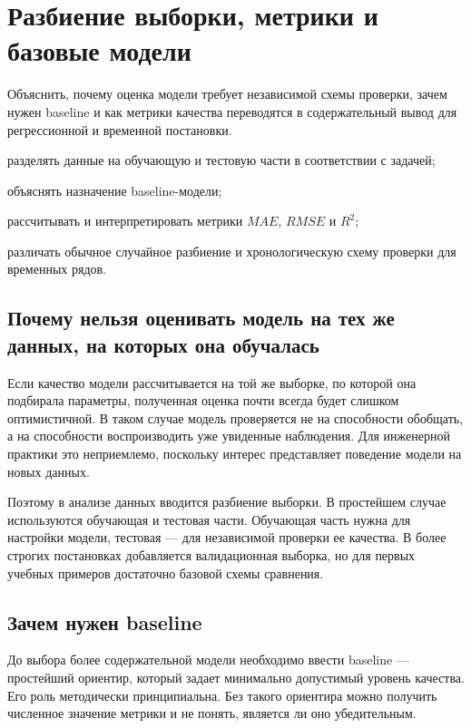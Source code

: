 \chapter{Разбиение выборки, метрики и базовые модели}

\chaptergoals
  {Объяснить, почему оценка модели требует независимой схемы проверки, зачем нужен baseline и как метрики качества переводятся в содержательный вывод для регрессионной и временной постановки.}
  {
    \item разделять данные на обучающую и тестовую части в соответствии с задачей;
    \item объяснять назначение baseline-модели;
    \item рассчитывать и интерпретировать метрики \(MAE\), \(RMSE\) и \(R^2\);
    \item различать обычное случайное разбиение и хронологическую схему проверки для временных рядов.
  }

\section{Почему нельзя оценивать модель на тех же данных, на которых она обучалась}

Если качество модели рассчитывается на той же выборке, по которой она подбирала параметры, полученная оценка почти всегда будет слишком оптимистичной. В таком случае модель проверяется не на способности обобщать, а на способности воспроизводить уже увиденные наблюдения. Для инженерной практики это неприемлемо, поскольку интерес представляет поведение модели на новых данных.

Поэтому в анализе данных вводится разбиение выборки. В простейшем случае используются обучающая и тестовая части. Обучающая часть нужна для настройки модели, тестовая --- для независимой проверки ее качества. В более строгих постановках добавляется валидационная выборка, но для первых учебных примеров достаточно базовой схемы сравнения.

\section{Зачем нужен baseline}

До выбора более содержательной модели необходимо ввести baseline --- простейший ориентир, который задает минимально допустимый уровень качества. Его роль методически принципиальна. Без такого ориентира можно получить численное значение метрики и не понять, является ли оно убедительным.

